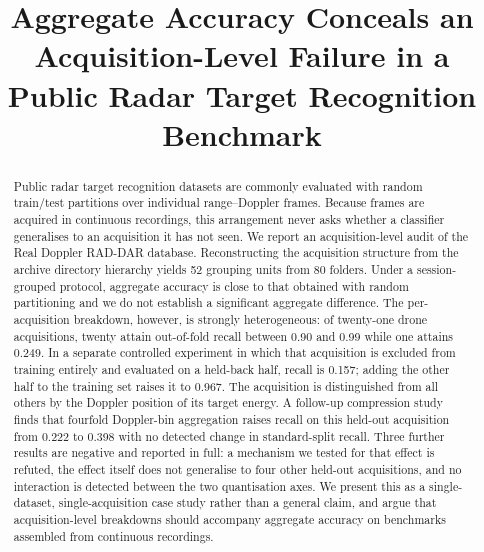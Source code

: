 \documentclass[conference]{IEEEtran}
\begin{document}
\title{Aggregate Accuracy Conceals an Acquisition-Level Failure
in a Public Radar Target Recognition Benchmark}

\author{
}

\maketitle

\begin{abstract}
Public radar target recognition datasets are commonly evaluated with random
train/test partitions over individual range--Doppler frames. Because frames
are acquired in continuous recordings, this arrangement never asks whether a
classifier generalises to an acquisition it has not seen. We report an
acquisition-level audit of the Real Doppler RAD-DAR database. Reconstructing
the acquisition structure from the archive directory hierarchy yields 52
grouping units from 80 folders. Under a session-grouped protocol, aggregate
accuracy is close to that obtained with random partitioning and we do not
establish a significant aggregate difference. The per-acquisition breakdown,
however, is strongly heterogeneous: of twenty-one drone acquisitions, twenty
attain out-of-fold recall between 0.90 and 0.99 while one attains 0.249. In a
separate controlled experiment in which that acquisition is excluded from
training entirely and evaluated on a held-back half, recall is 0.157; adding
the other half to the training set raises it to 0.967. The acquisition is
distinguished from all others by the Doppler position of its target energy.
A follow-up compression study finds that fourfold Doppler-bin aggregation
raises recall on this held-out acquisition from 0.222 to 0.398 with no
detected change in standard-split recall. Three further results are negative
and reported in full: a mechanism we tested for that effect is refuted, the
effect itself does not generalise to four other held-out acquisitions, and no
interaction is detected between the two quantisation axes. We present this as a single-dataset,
single-acquisition case study rather than a general claim, and argue that
acquisition-level breakdowns should accompany aggregate accuracy on
benchmarks assembled from continuous recordings.
\end{abstract}
\end{document}
